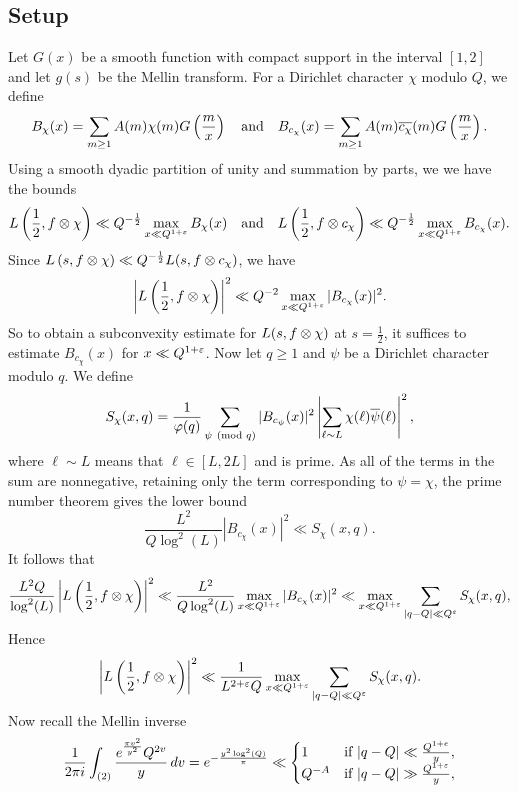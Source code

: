 \documentclass[12pt,reqno,oneside]{amsart}
\begin{document}
  \subsection*{Setup}
    Let $G(x)$ be a smooth function with compact support in the interval $[1,2]$ and let $g(s)$ be the Mellin transform.
    For a Dirichlet character $\chi$ modulo $Q$, we define
    \[
      B_{\chi}(x) = \sum_{m \ge 1}A(m)\chi(m)G\left(\frac{m}{x}\right) \quad \text{and} \quad B_{c_{\chi}}(x) = \sum_{m \ge 1}A(m)\overline{c_{\chi}}(m)G\left(\frac{m}{x}\right).
    \]
    Using a smooth dyadic partition of unity and summation by parts, we we have the bounds
    \[
      L\left(\frac{1}{2},f \otimes \chi \right) \ll Q^{-\frac{1}{2}}\max_{x \ll Q^{1+\varepsilon}}B_{\chi}(x) \quad \text{and} \quad L\left(\frac{1}{2},f \otimes c_{\chi} \right) \ll Q^{-\frac{1}{2}}\max_{x \ll Q^{1+\varepsilon}}B_{c_{\chi}}(x).
    \]
    Since $L\left(s,f \otimes \chi\right) \ll Q^{-\frac{1}{2}}L(s,f \otimes c_{\chi})$, we have
    \[
      \left|L\left(\frac{1}{2},f \otimes \chi \right)\right|^{2} \ll Q^{-2}\max_{x \ll Q^{1+\varepsilon}}|B_{c_{\chi}}(x)|^{2}.
    \]
    So to obtain a subconvexity estimate for $L(s,f \otimes \chi)$ at $s = \frac{1}{2}$, it suffices to estimate $B_{c_{\chi}}(x)$ for $x \ll Q^{1+\varepsilon}$. Now let $q \ge 1$ and $\psi$ be a Dirichlet character modulo $q$. We define
    \[
      S_{\chi}(x,q) = \frac{1}{\varphi(q)}\sum_{\psi \ \left(\text{mod }q\right)}|B_{c_{\psi}}(x)|^{2}\left|\sum_{\ell \sim L}\chi(\ell)\overline{\psi}(\ell)\right|^{2},
    \]
    where $\ell \sim L$ means that $\ell \in [L,2L]$ and is prime. As all of the terms in the sum are nonnegative, retaining only the term corresponding to $\psi = \chi$, the prime number theorem gives the lower bound
    \[
      \frac{L^{2}}{Q\log^{2}(L)}|B_{c_{\chi}}(x)|^{2} \ll S_{\chi}(x,q).
    \]
    It follows that
    \[
      \frac{L^{2}Q}{\log^{2}(L)}\left|L\left(\frac{1}{2},f \otimes \chi \right)\right|^{2} \ll \frac{L^{2}}{Q\log^{2}(L)}\max_{x \ll Q^{1+\varepsilon}}|B_{c_{\chi}}(x)|^{2} \ll \max_{x \ll Q^{1+\varepsilon}}\sum_{|q-Q| \ll Q^{\varepsilon}}S_{\chi}(x,q),
    \]
    Hence
    \[
      \left|L\left(\frac{1}{2},f \otimes \chi \right)\right|^{2} \ll \frac{1}{L^{2+\varepsilon}Q}\max_{x \ll Q^{1+\varepsilon}}\sum_{|q-Q| \ll Q^{\varepsilon}}S_{\chi}(x,q).
    \]
    Now recall the Mellin inverse
    \[
      \frac{1}{2\pi i}\int_{(2)}\frac{e^{\frac{\pi v^{2}}{y^{2}}}Q^{2v}}{y}\,dv = e^{-\frac{y^{2}\log^{2}(Q)}{\pi}} \ll \begin{cases} 1 & \text{if $|q-Q| \ll \frac{Q^{1+e}}{y}$}, \\ Q^{-A} & \text{if $|q-Q| \gg \frac{Q^{1+\varepsilon}}{y}$}, \end{cases}
    \]
\end{document}
